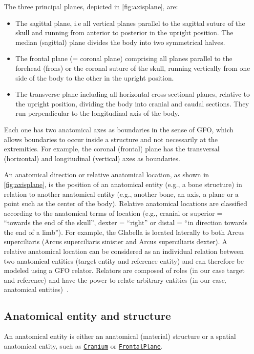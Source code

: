 \documentclass[sw]{iosart2x}
\newcommand{\anno}[1]{\href{https://annosaxfdm.de/ontology/#1}{\texttt{#1}}}
\begin{document}
The three principal planes, depicted in \cref{fig:axisplane}, are:
\begin{itemize}
\item The sagittal plane, i.e all vertical planes parallel to the sagittal suture of the skull and running from anterior to posterior in the upright position.
The median (sagittal) plane divides the body into two symmetrical halves.
\item The frontal plane (= coronal plane) comprising all planes parallel to the forehead (frons) or the coronal suture of the skull, running vertically from one side of the body to the other in the upright position.
\item The transverse plane including all horizontal cross-sectional planes, relative to the upright position, dividing the body into cranial and caudal sections.
They run perpendicular to the longitudinal axis of the body.
\end{itemize}

Each one has two anatomical axes as boundaries in the sense of GFO, which allows boundaries to occur inside a structure and not necessarily at the extremities.
For example, the coronal (frontal) plane has the transversal (horizontal) and longitudinal (vertical) axes as boundaries.

An anatomical direction or relative anatomical location, as shown in \cref{fig:axisplane}, is the position of an anatomical entity (e.g., a bone structure) in relation to another anatomical entity (e.g., another bone, an axis, a plane or a point such as the center of the body).
Relative anatomical locations are classified according to the anatomical terms of location (e.g., cranial or superior = \enquote{towards the end of the skull}, dexter = \enquote{right} or distal = \enquote{in direction towards the end of a limb}).
For example, the Glabella is located laterally to both Arcus superciliaris (Arcus superciliaris sinister and Arcus superciliaris dexter).
A relative anatomical location can be considered as an individual relation between two anatomical entities (target entity and reference entity) and can therefore be modeled using a GFO relator.
Relators are composed of roles (in our case target and reference) and have the power to relate arbitrary entities (in our case, anatomical entities)~\citep{gfocategory}.


\subsection{Anatomical entity and structure}
An anatomical entity is either an anatomical (material) structure or a spatial anatomical entity, such as \anno{Cranium} or \anno{FrontalPlane}.
\end{document}
